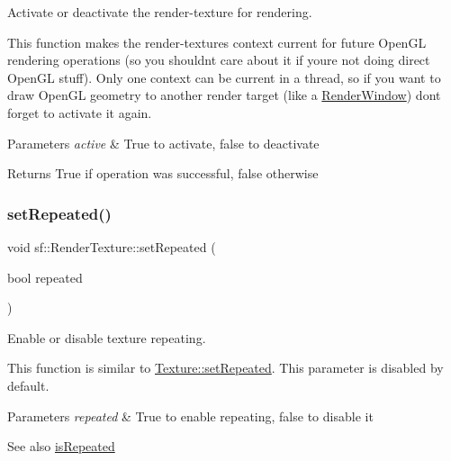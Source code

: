 Activate or deactivate the render-\/texture for rendering. 

This function makes the render-\/texture\textquotesingle{}s context current for future Open\+GL rendering operations (so you shouldn\textquotesingle{}t care about it if you\textquotesingle{}re not doing direct Open\+GL stuff). Only one context can be current in a thread, so if you want to draw Open\+GL geometry to another render target (like a \hyperlink{classsf_1_1_render_window}{Render\+Window}) don\textquotesingle{}t forget to activate it again.


\begin{DoxyParams}{Parameters}
{\em active} & True to activate, false to deactivate\\
\hline
\end{DoxyParams}
\begin{DoxyReturn}{Returns}
True if operation was successful, false otherwise 
\end{DoxyReturn}
\mbox{\label{classsf_1_1_render_texture_af8f97b33512bf7d5b6be3da6f65f7365}} 
\subsubsection{\texorpdfstring{set\+Repeated()}{setRepeated()}}
{\footnotesize\ttfamily void sf\+::\+Render\+Texture\+::set\+Repeated (\begin{DoxyParamCaption}\item[{bool}]{repeated }\end{DoxyParamCaption})}



Enable or disable texture repeating. 

This function is similar to \hyperlink{classsf_1_1_texture_aaa87d1eff053b9d4d34a24c784a28658}{Texture\+::set\+Repeated}. This parameter is disabled by default.


\begin{DoxyParams}{Parameters}
{\em repeated} & True to enable repeating, false to disable it\\
\hline
\end{DoxyParams}
\begin{DoxySeeAlso}{See also}
\hyperlink{classsf_1_1_render_texture_a81c5a453a21c7e78299b062b97dc8c87}{is\+Repeated} 
\end{DoxySeeAlso}
\mbox{\label{classsf_1_1_render_texture_af08991e63c6020865dd07b20e27305b6}} 
